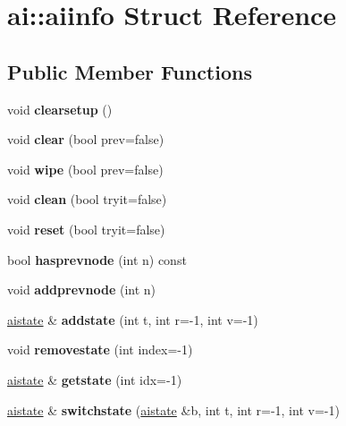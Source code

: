 \hypertarget{structai_1_1aiinfo}{}\section{ai\+:\+:aiinfo Struct Reference}
\label{structai_1_1aiinfo}
\subsection*{Public Member Functions}
\begin{DoxyCompactItemize}
\item 
\mbox{\label{structai_1_1aiinfo_a3f83e90e46f40300305fffe9c4183697}} 
void {\bfseries clearsetup} ()
\item 
\mbox{\label{structai_1_1aiinfo_a57c697dd93245166fe8e17adde8ee703}} 
void {\bfseries clear} (bool prev=false)
\item 
\mbox{\label{structai_1_1aiinfo_a134cc32b873d101228ba2ea37a8ba38f}} 
void {\bfseries wipe} (bool prev=false)
\item 
\mbox{\label{structai_1_1aiinfo_a32190baba397c45b70e267bd9423b47b}} 
void {\bfseries clean} (bool tryit=false)
\item 
\mbox{\label{structai_1_1aiinfo_a5755ce8e1e8d968e420e4321073cd895}} 
void {\bfseries reset} (bool tryit=false)
\item 
\mbox{\label{structai_1_1aiinfo_a6011da2736a33f7ad54ad724c22574f3}} 
bool {\bfseries hasprevnode} (int n) const
\item 
\mbox{\label{structai_1_1aiinfo_ac4ca6d03a4ddcc0fef2e78696b5f6b90}} 
void {\bfseries addprevnode} (int n)
\item 
\mbox{\label{structai_1_1aiinfo_ac5901826d1d8b9a5e61fbbe1ce4b8955}} 
\hyperlink{structai_1_1aistate}{aistate} \& {\bfseries addstate} (int t, int r=-\/1, int v=-\/1)
\item 
\mbox{\label{structai_1_1aiinfo_a847a8c4ef9ac4993f72ca97fff897680}} 
void {\bfseries removestate} (int index=-\/1)
\item 
\mbox{\label{structai_1_1aiinfo_aaa36d2ff13d0e548b95bed36315672b1}} 
\hyperlink{structai_1_1aistate}{aistate} \& {\bfseries getstate} (int idx=-\/1)
\item 
\mbox{\label{structai_1_1aiinfo_a0f41f213b438b8dfe17b1f47d1dcda43}} 
\hyperlink{structai_1_1aistate}{aistate} \& {\bfseries switchstate} (\hyperlink{structai_1_1aistate}{aistate} \&b, int t, int r=-\/1, int v=-\/1)
\end{DoxyCompactItemize}
